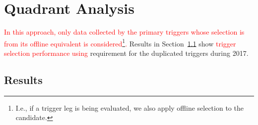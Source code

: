\section{Quadrant Analysis}\label{ssec:quadrant}

\textcolor{red}{In this approach, only data collected by the primary triggers whose selection is from its offline equivalent is considered\footnote{I.e., if a \tight{} trigger leg is being evaluated, we also apply \tight{} offline selection to the candidate.}.}
Results in Section~\ref{top:quadrant_results} show
\textcolor{red}{trigger selection performance using} \tight{} requirement for the duplicated triggers during
2017.

\subsection{Results}\label{top:quadrant_results}


